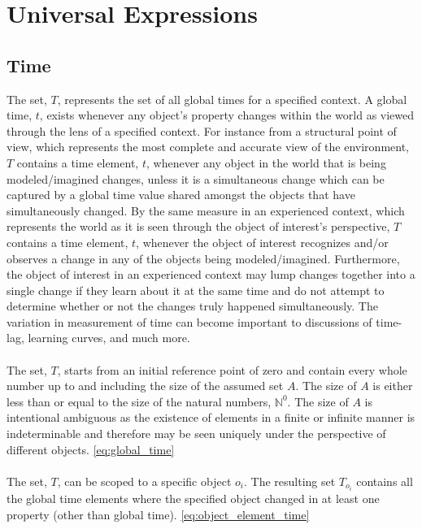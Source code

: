 \documentclass[]{article}
\begin{document}
\section*{Universal Expressions}
\subsection*{Time}
The set, $T$, represents the set of all global times for a specified context. A global time, $t$, exists whenever any object's property changes within the world as viewed through the lens of a specified context. For instance from a structural point of view, which represents the most complete and accurate view of the environment, $T$ contains a time element, $t$, whenever any object in the world that is being modeled/imagined changes, unless it is a simultaneous change which can be captured by a global time value shared amongst the objects that have simultaneously changed. By the same measure in an experienced context, which represents the world as it is seen through the object of interest's perspective, $T$ contains a time element, $t$, whenever the object of interest recognizes and/or observes a change in any of the objects being modeled/imagined. Furthermore, the object of interest in an experienced context may lump changes together into a single change if they learn about it at the same time and do not attempt to determine whether or not the changes truly happened simultaneously. The variation in measurement of time can become important to discussions of time-lag, learning curves, and much more. 
\\
\\
The set, $T$, starts from an initial reference point of zero and contain every whole number up to and including the size of the assumed set $A$. The size of $A$ is either less than or equal to the size of the natural numbers, $\mathbb{N}^{0}$. The size of $A$ is intentional ambiguous as the existence of elements in a finite or infinite manner is indeterminable and therefore may be seen uniquely under the perspective of different objects. \eqref{eq:global_time}
\\
\\ 
The set, $T$, can be scoped to a specific object $o_{i}$. The resulting set $T_{o_{i}}$ contains all the global time elements where the specified object changed in at least one property (other than global time). \eqref{eq:object_element_time}
\end{document}
